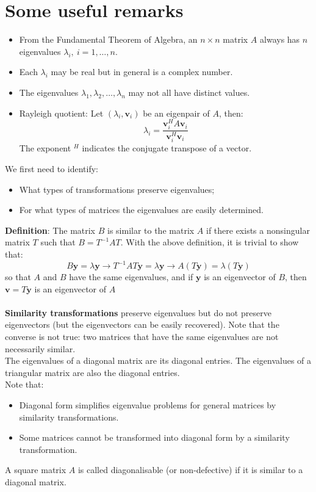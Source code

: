 \documentclass[11pt]{book}
\begin{document}
\section*{Some useful remarks}
\begin{itemize}
  \item From the Fundamental Theorem of Algebra, an $n \times n$ matrix $A$ always has $n$ eigenvalues $\lambda_{i}, \ i=1, \ldots, n$.

  \item Each $\lambda_{i}$ may be real but in general is a complex number.

  \item The eigenvalues $\lambda_{1}, \lambda_{2}, \ldots, \lambda_{n}$ may not all have distinct values.

  \item Rayleigh quotient: Let $\left(\lambda_{i}, \mathbf{v}_{i}\right)$ be an eigenpair of $A$, then:
$$
\lambda_{i}=\frac{\mathbf{v}_{i}^{H} A \mathbf{v}_{i}}{\mathbf{v}_{i}^{H} \mathbf{v}_{i}}
$$
The exponent $^H$ indicates the conjugate transpose of a vector.

\end{itemize}
We first need to identify:
\begin{itemize}
  \item What types of transformations preserve eigenvalues;

  \item For what types of matrices the eigenvalues are easily determined.

\end{itemize}
\textbf{Definition}: The matrix $B$ is similar to the matrix $A$ if there exists a nonsingular matrix $T$ such that $B=T^{-1} A T$.
With the above definition, it is trivial to show that:
$$
B \mathbf{y}=\lambda \mathbf{y} \rightarrow T^{-1}AT \mathbf{y}=\lambda \mathbf{y} \rightarrow A(T\mathbf{y})=\lambda(T \mathbf{y})
$$
so that $A$ and $B$ have the same eigenvalues, and if $\mathbf{y}$ is an eigenvector of $B$, then $\mathbf{v}=T \mathbf{y}$ is an eigenvector of $A$ \\ \\
\textbf{Similarity transformations} preserve eigenvalues but do not preserve eigenvectors (but the eigenvectors can be easily recovered).
Note that the converse is not true: two matrices that have the same eigenvalues are not necessarily similar.\\
The eigenvalues of a diagonal matrix are its diagonal entries. The eigenvalues of a triangular matrix are also the diagonal entries. \\
Note that:
\begin{itemize}
  \item Diagonal form simplifies eigenvalue problems for general matrices by similarity transformations.

  \item Some matrices cannot be transformed into diagonal form by a similarity transformation.

\end{itemize}
A square matrix $A$ is called diagonalisable (or non-defective) if it is similar to a diagonal matrix.
\end{document}
